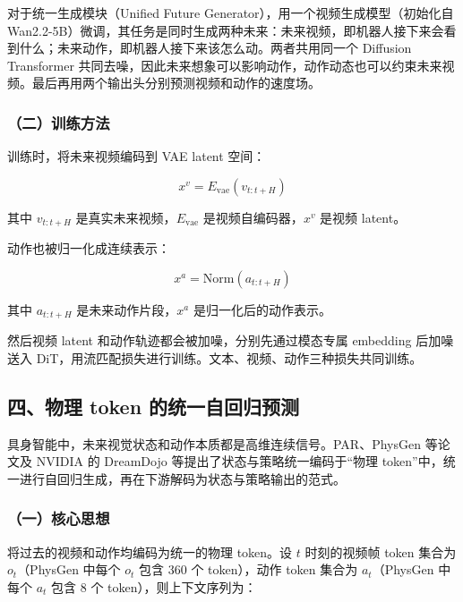 对于统一生成模块（Unified Future Generator），用一个视频生成模型（初始化自 Wan2.2-5B）微调，其任务是同时生成两种未来：未来视频，即机器人接下来会看到什么；未来动作，即机器人接下来该怎么动。两者共用同一个 Diffusion Transformer 共同去噪，因此未来想象可以影响动作，动作动态也可以约束未来视频。最后再用两个输出头分别预测视频和动作的速度场。

\hypertarget{ux4e8cux8badux7ec3ux65b9ux6cd5-2}{%
\subsubsection{（二）训练方法}\label{ux4e8cux8badux7ec3ux65b9ux6cd5-2}}

训练时，将未来视频编码到 VAE latent 空间：

\[
x^v = E_{\mathrm{vae}}\left(v_{t:t+H}\right)
\]

其中 \(v_{t:t+H}\) 是真实未来视频，\(E_{\mathrm{vae}}\) 是视频自编码器，\(x^v\) 是视频 latent。

动作也被归一化成连续表示：

\[
x^a = \mathrm{Norm}\left(a_{t:t+H}\right)
\]

其中 \(a_{t:t+H}\) 是未来动作片段，\(x^a\) 是归一化后的动作表示。

然后视频 latent 和动作轨迹都会被加噪，分别先通过模态专属 embedding 后加噪送入 DiT，用流匹配损失进行训练。文本、视频、动作三种损失共同训练。

\hypertarget{ux56dbux7269ux7406-token-ux7684ux7edfux4e00ux81eaux56deux5f52ux9884ux6d4b}{%
\subsection{四、物理 token 的统一自回归预测}\label{ux56dbux7269ux7406-token-ux7684ux7edfux4e00ux81eaux56deux5f52ux9884ux6d4b}}

具身智能中，未来视觉状态和动作本质都是高维连续信号。PAR、PhysGen 等论文及 NVIDIA 的 DreamDojo 等提出了状态与策略统一编码于``物理 token''中，统一进行自回归生成，再在下游解码为状态与策略输出的范式。

\hypertarget{ux4e00ux6838ux5fc3ux601dux60f3-28}{%
\subsubsection{（一）核心思想}\label{ux4e00ux6838ux5fc3ux601dux60f3-28}}

将过去的视频和动作均编码为统一的物理 token。设 \(t\) 时刻的视频帧 token 集合为 \(o_t\)（PhysGen 中每个 \(o_t\) 包含 360 个 token），动作 token 集合为 \(a_t\)（PhysGen 中每个 \(a_t\) 包含 8 个 token），则上下文序列为：


